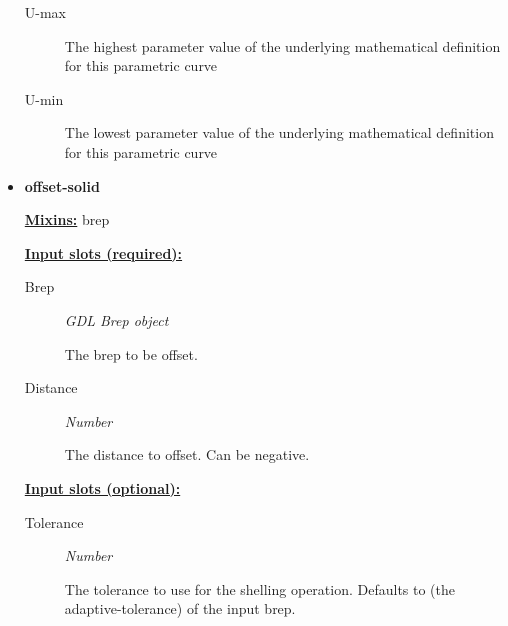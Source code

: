\documentclass [11pt]{book}
\begin{document}
\begin{itemize}
\begin{description}
\item [U-max]

The highest parameter value of the underlying mathematical definition
for this parametric curve




\item [U-min]

The lowest parameter value of the underlying mathematical definition
for this parametric curve




\end{description}







\item {}
\label{prim:offset-solid}
\textbf{offset-solid}


\textbf{
\underline{Mixins:}} brep






\textbf{
\underline{Input slots (required):}}

\begin{description}

\item [Brep]
\emph{GDL Brep object}

 The brep to be offset.




\item [Distance]
\emph{Number}

 The distance to offset. Can be negative.




\end{description}






\textbf{
\underline{Input slots (optional):}}

\begin{description}

\item [Tolerance]
\emph{Number}

 The tolerance to use for the shelling operation.
Defaults to (the adaptive-tolerance) of the input brep.




\end{description}








\end{itemize}
\end{document}
